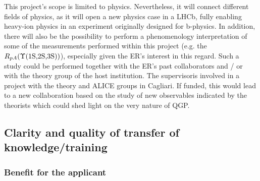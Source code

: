 \documentclass[a4paper,11pt]{article}
\newcommand{\ER}{ER}
\newcommand{\Supervisor}{The supervisor}
\begin{document}
This project's scope is limited to physics. Nevertheless, it will connect different fields of physics, as it will open a new physics case in a LHCb, fully enabling heavy-ion physics in an experiment originally designed for b-physics.
In addition, there will also be the possibility to perform a phenomenology interpretation of some of the measurements performed within this project (e.g. the $R_{pA}(\Upsilon\text{(1S,2S,3S)})$), especially given the \ER's interest in this regard. Such a study could be performed together with the \ER's past collaborators and / or with the theory group of the host institution. \Supervisor is involved in a project with the theory and ALICE  groups in Cagliari. If funded, this would lead to a new collaboration based on the study of new observables indicated by the theorists which could shed light on the very nature of QGP.

%       

\subsection{Clarity and quality of transfer of knowledge/training}



\subsubsection{Benefit for the applicant}
\label{sec:benefitapplicant}
\end{document}
